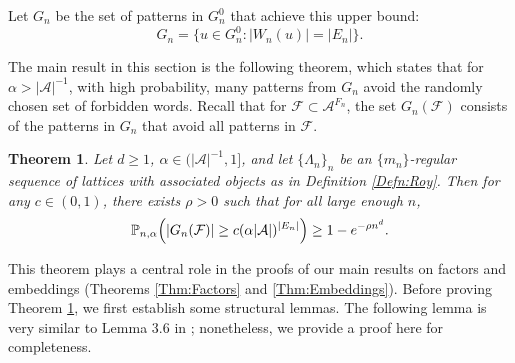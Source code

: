 \documentclass[12pt]{amsart}
\newtheorem{theorem}{Theorem}[section]
\theoremstyle{definition}
\begin{document}
Let $G_n$ be the set of patterns in $G_n^0$ that achieve this upper bound:
\begin{equation*}
G_n = \bigl\{ u \in G_n^0 : |W_n(u)| = |E_n| \bigr\}.
\end{equation*}


The main result in this section is the following theorem, which states that for $\alpha > |\mathcal{A}|^{-1}$, with high probability, many patterns from $G_n$ avoid the randomly chosen set of forbidden words. Recall that for $\mathcal{F} \subset \mathcal{A}^{F_n}$, the set $G_n(\mathcal{F})$ consists of the patterns in $G_n$ that avoid all patterns in $\mathcal{F}$.

\begin{theorem} \label{Thm:SecondMomentMethod}
Let $d \geq 1$, $\alpha \in ( |\mathcal{A}|^{-1}, 1]$, and let $\{\Lambda_n\}_n$ be an $\{m_n\}$-regular sequence of lattices with associated objects as in Definition \ref{Defn:Roy}.
Then for any $c \in (0,1)$, there exists $\rho >0$ such that for all large enough $n$,
\begin{equation*}
\mathbb{P}_{n,\alpha} \Bigl( | G_n(\mathcal{F}) | \geq c (\alpha |\mathcal{A}|)^{|E_n|} \Bigr) \geq 1- e^{-\rho n^d}.
\end{equation*}
\end{theorem}

This theorem plays a central role in the proofs of our main results on factors and embeddings (Theorems \ref{Thm:Factors} and \ref{Thm:Embeddings}).
Before proving Theorem \ref{Thm:SecondMomentMethod}, we first establish some structural lemmas. The following lemma is very similar to Lemma 3.6 in \cite{McGoffPavlov}; nonetheless, we provide a proof here for completeness.
\end{document}
